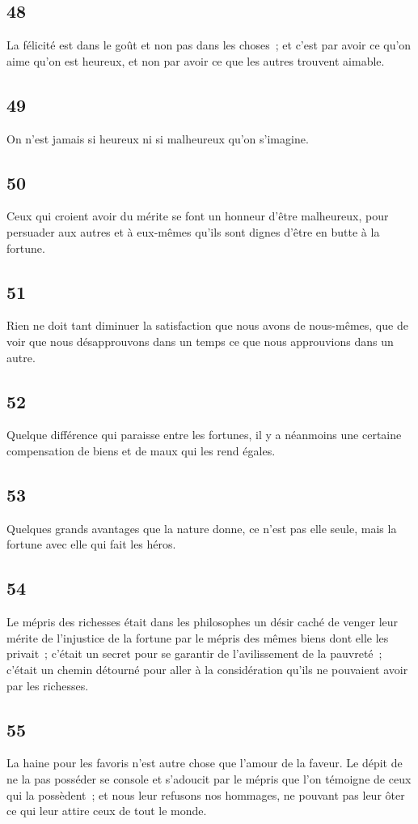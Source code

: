 \documentclass[french,twoside]{book} %
\begin{document}
\subsection[{48}]{ \textsc{48} }
\noindent La félicité est dans le goût et non pas dans les choses ; et c’est par avoir ce qu’on aime qu’on est heureux, et non par avoir ce que les autres trouvent aimable.
\subsection[{49}]{ \textsc{49} }
\noindent On n’est jamais si heureux ni si malheureux qu’on s’imagine.
\subsection[{50}]{ \textsc{50} }
\noindent Ceux qui croient avoir du mérite se font un honneur d’être malheureux, pour persuader aux autres et à eux-mêmes qu’ils sont dignes d’être en butte à la fortune.
\subsection[{51}]{ \textsc{51} }
\noindent Rien ne doit tant diminuer la satisfaction que nous avons de nous-mêmes, que de voir que nous désapprouvons dans un temps ce que nous approuvions dans un autre.
\subsection[{52}]{ \textsc{52} }
\noindent Quelque différence qui paraisse entre les fortunes, il y a néanmoins une certaine compensation de biens et de maux qui les rend égales.
\subsection[{53}]{ \textsc{53} }
\noindent Quelques grands avantages que la nature donne, ce n’est pas elle seule, mais la fortune avec elle qui fait les héros.
\subsection[{54}]{ \textsc{54} }
\noindent Le mépris des richesses était dans les philosophes un désir caché de venger leur mérite de l’injustice de la fortune par le mépris des mêmes biens dont elle les privait ; c’était un secret pour se garantir de l’avilissement de la pauvreté ; c’était un chemin détourné pour aller à la considération qu’ils ne pouvaient avoir par les richesses.
\subsection[{55}]{ \textsc{55} }
\noindent La haine pour les favoris n’est autre chose que l’amour de la faveur. Le dépit de ne la pas posséder se console et s’adoucit par le mépris que l’on témoigne de ceux qui la possèdent ; et nous leur refusons nos hommages, ne pouvant pas leur ôter ce qui leur attire ceux de tout le monde.
\end{document}
